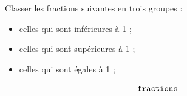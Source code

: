 \documentclass[exercice]{thedocument}%
\begin{document}
%
Classer les fractions suivantes en trois groupes :
\begin{itemize}
    \item celles qui sont inférieures à 1 ;
    \item celles qui sont supérieures à 1 ;
    \item celles qui sont égales à 1 ;
\end{itemize}\vskip10pt
$$\<fractions;$$
\end{document}
